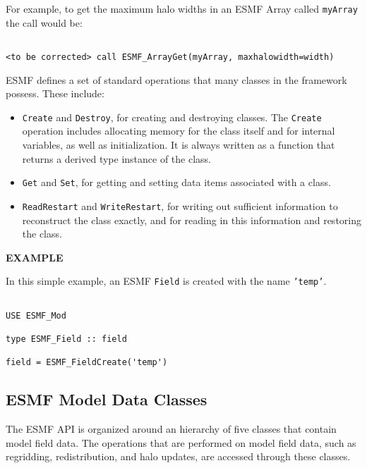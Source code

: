 For example, to get the maximum halo widths in an ESMF Array called
{\tt myArray} the call would be:

\begin{verbatim}

<to be corrected> call ESMF_ArrayGet(myArray, maxhalowidth=width)

\end{verbatim}

ESMF defines a set of standard operations that many classes 
in the framework possess.  These include:
\begin{itemize}
\item {\tt Create} and {\tt Destroy}, for creating and destroying 
classes.  The {\tt Create} operation includes allocating memory 
for the class itself and for internal variables, as well as
initialization.  It is always written as a function that returns
a derived type instance of the class.
\item {\tt Get} and {\tt Set}, for getting and setting data items 
associated with a class.
\item {\tt ReadRestart} and {\tt WriteRestart}, for writing out 
sufficient information to reconstruct the class exactly, and for 
reading in this information and restoring the class.
\end{itemize}


{\bf EXAMPLE}

In this simple example, an ESMF {\tt Field} is created with the 
name {\tt 'temp'}.  

\begin{verbatim}

USE ESMF_Mod

type ESMF_Field :: field

field = ESMF_FieldCreate('temp')

\end{verbatim}


\subsection{ESMF Model Data Classes}

The ESMF API is organized around an hierarchy of five classes that 
contain model field data.  The operations that are performed
on model field data, such as regridding, redistribution, and halo 
updates, are accessed through these classes.  

